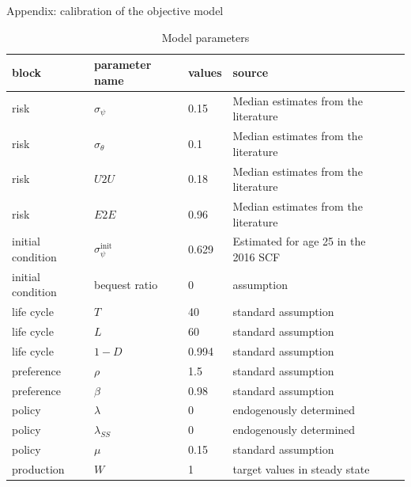 \documentclass{beamer}
\begin{document}
\begin{frame}{Appendix: calibration of the objective model}
	\label{appendix:calibration}	
	\begin{table}[p]
		\centering
			\caption{Model parameters}
			\label{tab:calibration}
					\begin{adjustbox}{width={0.8\textwidth}}
	\begin{tabular}{lllll}
		\hline 
		block             & parameter name              & values & source                               &  \\
		\hline 
		risk              & $\sigma_\psi$               & 0.15   & Median estimates from the literature &  \\
		risk              & $\sigma_\theta$             & 0.1    & Median estimates from the literature &  \\
		risk              & $U2U$                       & 0.18   & Median estimates from the literature &  \\
		risk              & $E2E$                       & 0.96   & Median estimates from the literature &  \\
		initial condition & $\sigma_\psi^{\text{init}}$ & 0.629  & Estimated for age 25 in the 2016 SCF &  \\
		initial condition & bequest ratio               & 0      & assumption                           &  \\
		life cycle        & $T$                         & 40     & standard assumption                  &  \\
		life cycle        & $L$                         & 60     & standard assumption                  &  \\
		life cycle        & $1-D$                       & 0.994  & standard assumption                  &  \\
		preference        & $\rho$                      & 1.5    & standard assumption                  &  \\
		preference        & $\beta$                     & 0.98   & standard assumption                  &  \\
		policy            & $\lambda$                   & 0      & endogenously determined              &  \\
		policy            & $\lambda_{SS}$              & 0      & endogenously determined              &  \\
		policy            & $\mu$                       & 0.15   & standard assumption                  &  \\
		production        & $W$                         & 1      & target values in steady state        &  \\

\end{tabular}
\end{adjustbox}
\end{table}
\end{frame}
\end{document}
